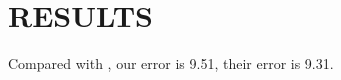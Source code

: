 \section{RESULTS}
\label{sec:Res}



Compared with \cite{ren2016three}, our error is 9.51, their error is 9.31. 
